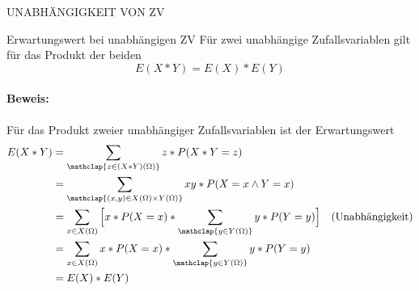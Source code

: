 {\color{red} UNABHÄNGIGKEIT VON ZV}


\begin{satz}{Erwartungswert bei unabhängigen ZV}
	Für zwei unabhängige Zufallsvariablen gilt für das Produkt der beiden
	\begin{equation*}
		E(X*Y)=E(X)*E(Y)
	\end{equation*}
\end{satz}
\paragraph{Beweis:}
Für das Produkt zweier unabhängiger Zufallsvariablen ist der Erwartungswert
\begin{align*}
	E(X*Y)&=\sum_{\mathclap{z\in(X*Y)(\Omega)}}z*P(X*Y=z)\\
	&=\sum_{\mathclap{(x,y)\in X(\Omega)\times Y(\Omega)}}xy*P(X=x \wedge Y=x)\\
	&=\sum_{x\in X(\Omega)}\Big[x*P(X=x) * \sum_{\mathclap{y\in Y(\Omega)}} y*P(Y=y)\Big] &\text{(Unabhängigkeit)}\\
	&=\sum_{x\in X(\Omega)}x*P(X=x)* \sum_{\mathclap{y\in Y(\Omega)}} y*P(Y=y)\\
	&=E(X)*E(Y)
\end{align*}


